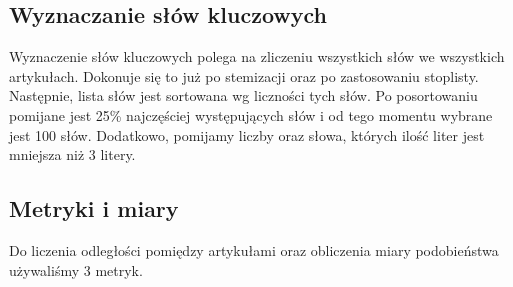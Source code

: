 \documentclass{classrep}
\begin{document}

\subsection{Wyznaczanie słów kluczowych}
Wyznaczenie słów kluczowych polega na zliczeniu wszystkich słów we wszystkich artykułach. Dokonuje się to już po stemizacji oraz po zastosowaniu stoplisty. Następnie, lista słów jest sortowana wg liczności tych słów. Po posortowaniu pomijane jest 25\% najczęściej występujących słów i od tego momentu wybrane jest 100 słów. Dodatkowo, pomijamy liczby oraz słowa, których ilość liter jest mniejsza niż 3 litery.

\subsection{Metryki i miary}
Do liczenia odległości pomiędzy artykułami oraz obliczenia miary podobieństwa używaliśmy 3 metryk.
\end{document}

